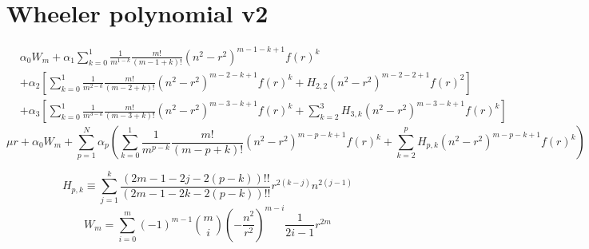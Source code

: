 

\section{Wheeler polynomial v2}
\begin{align}
  &\alpha_0W_m+\alpha_1\sum_{k=0}^1\frac{1}{m^{1-k}}\frac{m!}{(m-1+k)!}(n^2-r^2)^{m-1-k+1}f(r)^k\\
  &+\alpha_2\left[\sum_{k=0}^1\frac{1}{m^{2-k}}\frac{m!}{(m-2+k)!}(n^2-r^2)^{m-2-k+1}f(r)^k+H_{2,2}(n^2-r^2)^{m-2-2+1}f(r)^2\right]\\
  &+\alpha_3\left[\sum_{k=0}^1\frac{1}{m^{3-k}}\frac{m!}{(m-3+k)!}(n^2-r^2)^{m-3-k+1}f(r)^k+\sum_{k=2}^3H_{3,k}(n^2-r^2)^{m-3-k+1}f(r)^k\right]
\end{align}
\begin{equation*}
 \mu r+ \alpha_0W_m+\sum_{p=1}^N\alpha_p\left(\sum_{k=0}^1\frac{1}{m^{p-k}}\frac{m!}{(m-p+k)!}(n^2-r^2)^{m-p-k+1}f(r)^k+\sum_{k=2}^pH_{p,k}(n^2-r^2)^{m-p-k+1}f(r)^k\right)
\end{equation*}






\begin{equation}
  H_{p,k}\equiv \sum_{j=1}^k\frac{(2m-1-2j-2(p-k))!!}{(2m-1-2k-2(p-k))!!}r^{2(k-j)}n^{2(j-1)}
\end{equation}
\begin{equation}
  W_m=\sum_{i=0}^m(-1)^{m-1}\binom{m}{i}\left(-\frac{n^2}{r^2}\right)^{m-i}\frac{1}{2i-1}r^{2m}
\end{equation}

